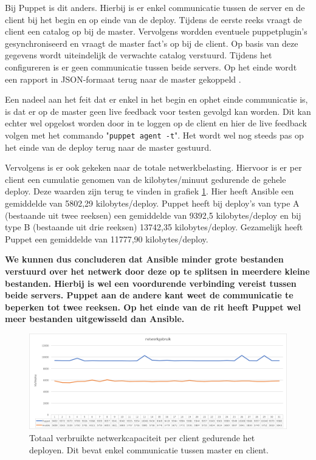 Bij Puppet is dit anders. Hierbij is er enkel communicatie tussen de server en de client bij het begin en op einde van de deploy.  Tijdens de eerste reeks vraagt de client een \gls{catalog} op bij de master. Vervolgens wordden eventuele \gls{puppetplugin}'s gesynchroniseerd en vraagt de master \gls{fact}'s op bij de client. Op basis van deze gegevens wordt uiteindelijk de verwachte \gls{catalog} verstuurd. Tijdens het configureren is er geen communicatie tussen beide servers. Op het einde wordt een rapport in JSON-formaat terug naar de master gekoppeld \autocite{neworkusage}.
 
Een nadeel aan het feit dat er enkel in het begin en ophet einde communicatie is, is dat er op de master geen live feedback voor testen gevolgd kan worden. Dit kan echter wel opgelost worden door in te loggen op de client en hier de live feedback volgen met het commando "\texttt{puppet agent -t}". Het wordt wel nog steeds pas op het einde van de deploy terug naar de master gestuurd.

Vervolgens is er ook gekeken naar de totale netwerkbelasting. Hiervoor is er per client een cumulatie genomen van de kilobytes/minuut gedurende de gehele deploy. Deze waarden zijn terug te vinden in grafiek \ref{fig:netwerkverbruik}. Hier heeft Ansible een gemiddelde van 5802,29 kilobytes/deploy. Puppet heeft bij deploy's van type A (bestaande uit twee reeksen) een gemiddelde van  9392,5 kilobytes/deploy en bij type B (bestaande uit drie reeksen) 13742,35 kilobytes/deploy. Gezamelijk heeft Puppet een gemiddelde van 11777,90 kilobytes/deploy. 

\textbf{We kunnen dus concluderen dat Ansible minder grote bestanden verstuurd over het netwerk door deze op te splitsen in meerdere kleine bestanden. Hierbij is wel een voordurende verbinding vereist tussen beide servers. Puppet aan de andere kant weet de communicatie te beperken tot twee reeksen. Op het einde van de rit heeft Puppet wel meer bestanden uitgewisseld dan  Ansible. }

\begin{figure}
	\includegraphics[width=\linewidth]{img/netwerkverbruik.png}
	\caption{Totaal verbruikte netwerkcapaciteit per client gedurende het deployen. Dit bevat enkel communicatie tussen master en client.}  
	\label{fig:netwerkverbruik}
\end{figure}


